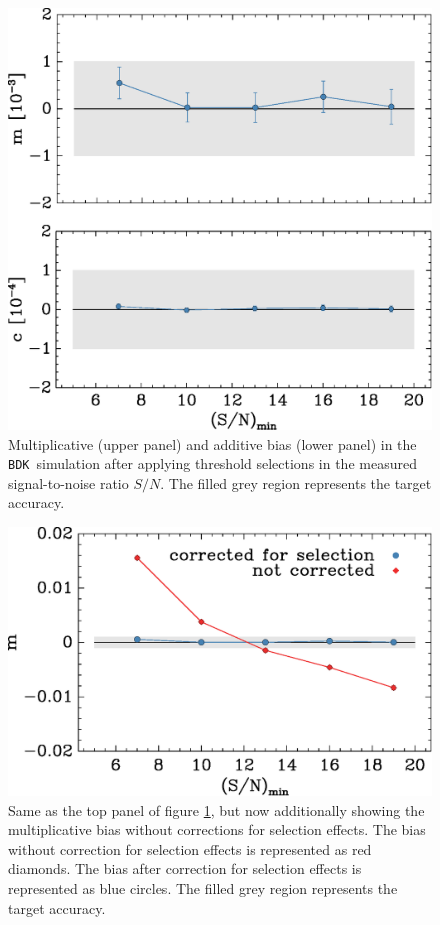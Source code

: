 \documentclass[iop]{emulateapj}
\newcommand{\snr}{$S/N$}
\newcommand{\bdksim}{\texttt{BDK}}
\begin{document}
\begin{figure}[h]
    \centering
    \includegraphics[width=\columnwidth]{mc-select-bias-thresh.eps}

    \caption{Multiplicative (upper panel) and
		additive bias (lower panel) in the \bdksim\ simulation after applying
        threshold selections in the measured signal-to-noise ratio \snr.   
        The filled grey region represents the target accuracy. } 

\label{fig:s2nthresh}
\end{figure}


\begin{figure}[h]
    \centering
    \includegraphics[width=\columnwidth]{mc-select-bias-thresh-with-nocorr.eps}

	\caption{Same as the top panel of figure \ref{fig:s2nthresh}, but now
additionally showing the multiplicative bias without corrections for selection
effects.  The bias without correction for selection effects is represented as
red diamonds. The bias after correction for selection effects is represented as
blue circles.  The filled grey region represents the target accuracy. } 

\label{fig:s2nthresh_nocorr}
\end{figure}
\end{document}

